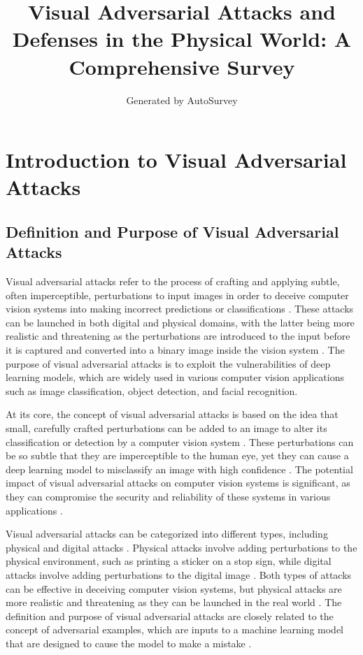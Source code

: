 \documentclass[11pt]{article}
\title{Visual Adversarial Attacks and Defenses in the Physical World: A Comprehensive Survey}
\author{Generated by AutoSurvey}
\date{}
\begin{document}
\maketitle
\tableofcontents
\newpage

\section{Introduction to Visual Adversarial Attacks}

\subsection{Definition and Purpose of Visual Adversarial Attacks}

Visual adversarial attacks refer to the process of crafting and applying subtle, often imperceptible, perturbations to input images in order to deceive computer vision systems into making incorrect predictions or classifications \cite{ref1}. These attacks can be launched in both digital and physical domains, with the latter being more realistic and threatening as the perturbations are introduced to the input before it is captured and converted into a binary image inside the vision system \cite{ref1}. The purpose of visual adversarial attacks is to exploit the vulnerabilities of deep learning models, which are widely used in various computer vision applications such as image classification, object detection, and facial recognition.

At its core, the concept of visual adversarial attacks is based on the idea that small, carefully crafted perturbations can be added to an image to alter its classification or detection by a computer vision system \cite{ref2}. These perturbations can be so subtle that they are imperceptible to the human eye, yet they can cause a deep learning model to misclassify an image with high confidence \cite{ref3}. The potential impact of visual adversarial attacks on computer vision systems is significant, as they can compromise the security and reliability of these systems in various applications \cite{ref4}.

Visual adversarial attacks can be categorized into different types, including physical and digital attacks \cite{ref5}. Physical attacks involve adding perturbations to the physical environment, such as printing a sticker on a stop sign, while digital attacks involve adding perturbations to the digital image \cite{ref1}. Both types of attacks can be effective in deceiving computer vision systems, but physical attacks are more realistic and threatening as they can be launched in the real world \cite{ref5}. The definition and purpose of visual adversarial attacks are closely related to the concept of adversarial examples, which are inputs to a machine learning model that are designed to cause the model to make a mistake \cite{ref4}.
\end{document}
